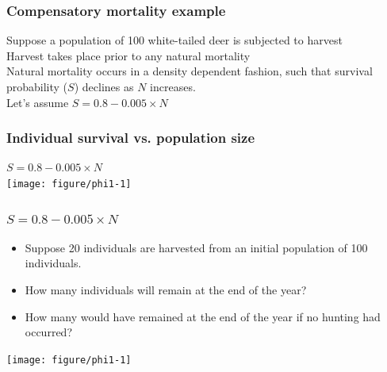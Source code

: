 \documentclass[color=usenames,dvipsnames]{beamer}\usepackage[]{graphicx}\usepackage[]{xcolor}
\begin{document}
\begin{frame}
  \frametitle{Compensatory mortality example}
  \large
  Suppose a population of 100 white-tailed deer is subjected to
  harvest \\
  \pause \vfill
  Harvest takes place prior to any natural mortality \\
  \pause \vfill
  Natural mortality occurs in a density dependent fashion,
  such that survival probability ($S$) declines as $N$ increases. \\
  \pause \vfill
  Let's assume %
  $S = 0.8 - 0.005 \times N$
\end{frame}



\begin{frame}[fragile]
  \frametitle{Individual survival vs. population size}

\centering
$S = 0.8 - 0.005 \times N$ \\
\texttt{[image: figure/phi1-1]} \\
\end{frame}





\begin{frame}
  \frametitle{$S = 0.8 - 0.005 \times N$}
  \begin{itemize}[<+->]
    \small
    \item Suppose 20 individuals are harvested from an initial
      population of 100 individuals.
    \item How many individuals will remain at the end of the year?
    \item How many would have remained at the end of the year if no
      hunting had occurred?
  \end{itemize}
  \begin{center}
    \texttt{[image: figure/phi1-1]}
  \end{center}
\end{frame}
\end{document}
